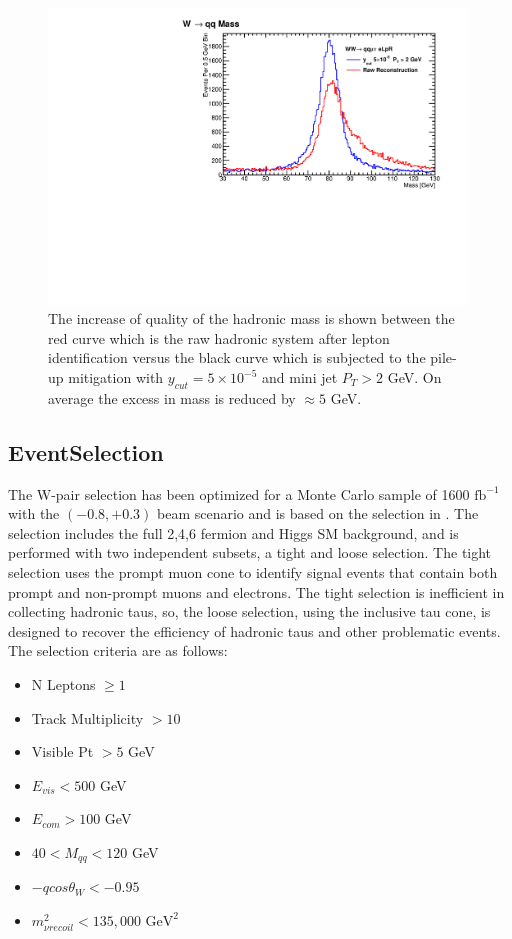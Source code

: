 \begin{figure}
\begin{minipage}{0.49\textwidth}
        \includegraphics[width=0.99\textwidth]{SupMass.pdf} %
        \caption{The increase of quality of the hadronic mass is shown between the red curve which is the raw hadronic system after lepton identification versus the black curve which is subjected to the pile-up mitigation with $y_{cut} = 5\times10^{-5}$ and mini jet $P_T > 2$ GeV. On average the excess in mass is reduced by $\approx 5$ GeV. }
        \label{fig:supmass}
    \end{minipage}
\end{figure}


\subsection{EventSelection}
\label{subsec:EventSelection}
The W-pair selection has been optimized for a Monte Carlo sample of 1600 $\text{fb}^{-1}$ with the $(-0.8,+0.3)$ beam scenario and is based on the selection in \cite{ivan}. The selection includes the full 2,4,6 fermion and Higgs SM background, and is performed with two independent subsets, a tight and loose selection. The tight selection uses the prompt muon cone to identify signal events that contain both prompt and non-prompt muons and electrons. The tight selection is inefficient in collecting hadronic taus, so, the loose selection, using the inclusive tau cone, is designed to recover the efficiency of hadronic taus and other problematic events. The selection criteria are as follows:
\begin{itemize}
\item N Leptons $\geq 1$
\item Track Multiplicity $> 10$  
\item Visible Pt $> 5$ GeV  
\item $E_{vis} < 500$ GeV 
\item $E_{com} > 100$ GeV
\item $40<M_{qq}<120$ GeV
\item  $-qcos\theta_W < -0.95$
\item  $m^2_{\nu recoil} < 135,000 \, \, \text{GeV}^2$
\end{itemize}

